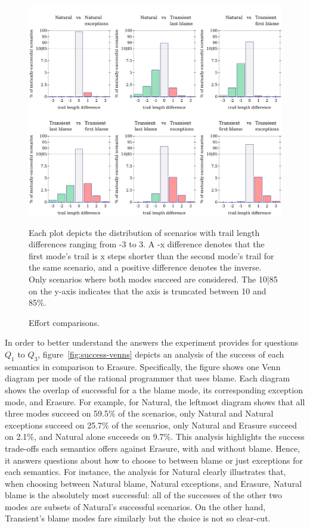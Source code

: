 \begin{figure}
  \centering
  \includegraphics[width=\textwidth]{./plots/bt-length-comparisons}

  \vspace{1em}
  \begin{minipage}{0.95\textwidth}
  Each plot depicts the distribution of scenarios with trail length
    differences ranging from -3 to 3.  A -x difference denotes that
    the first mode's trail is x steps shorter than the second mode's
    trail for the same scenario, and a positive difference denotes the
    inverse.  Only scenarios where both modes succeed are considered.  The
    10|85 on the y-axis indicates that the axis is truncated between 10
    and 85\%.
  \end{minipage}

  \caption{Effort comparisons.}
  \label{fig:effort-comparisons}
\end{figure}

In order to better understand the answers the experiment provides for
questions $Q_1$ to $Q_3$, figure~\ref{fig:success-venns} depicts an
analysis of the success of each semantics in comparison to Erasure.
Specifically, the figure shows one Venn diagram per mode of the rational
programmer that uses blame.  Each diagram shows the overlap of successful
for a  the blame mode, its corresponding exception mode, and Erasure.  For
example, for Natural, the leftmost diagram shows that all three modes
succeed on 59.5\% of the  scenarios, only Natural and Natural exceptions
succeed on 25.7\% of the scenarios, only Natural and Erasure succeed on
2.1\%, and Natural alone succeeds on 9.7\%.  This analysis highlights
the success trade-offs each semantics offers against Erasure, with and
without blame. Hence, it answers questions about how to choose to between
blame or just exceptions for each semantics.  For instance, the analysis
for Natural clearly illustrates that, when choosing between Natural blame,
Natural exceptions, and Erasure, Natural blame is the absolutely most
successful: all of the successes of the other two modes are subsets of
Natural's successful scenarios.  On the other hand, Transient's blame
modes fare similarly but the choice is not so clear-cut.


